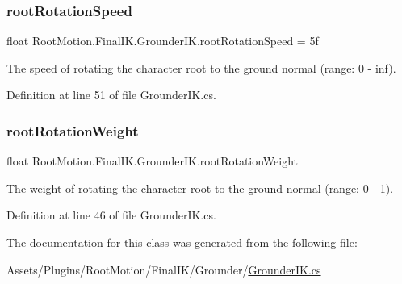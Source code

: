 \subsubsection{\texorpdfstring{root\+Rotation\+Speed}{rootRotationSpeed}}
{\footnotesize\ttfamily float Root\+Motion.\+Final\+I\+K.\+Grounder\+I\+K.\+root\+Rotation\+Speed = 5f}



The speed of rotating the character root to the ground normal (range\+: 0 -\/ inf). 



Definition at line 51 of file Grounder\+I\+K.\+cs.

\mbox{\label{class_root_motion_1_1_final_i_k_1_1_grounder_i_k_a176e6eeb4faf46b2dd60b200647d121e}} 
\subsubsection{\texorpdfstring{root\+Rotation\+Weight}{rootRotationWeight}}
{\footnotesize\ttfamily float Root\+Motion.\+Final\+I\+K.\+Grounder\+I\+K.\+root\+Rotation\+Weight}



The weight of rotating the character root to the ground normal (range\+: 0 -\/ 1). 



Definition at line 46 of file Grounder\+I\+K.\+cs.



The documentation for this class was generated from the following file\+:\begin{DoxyCompactItemize}
\item 
Assets/\+Plugins/\+Root\+Motion/\+Final\+I\+K/\+Grounder/\mbox{\hyperlink{_grounder_i_k_8cs}{Grounder\+I\+K.\+cs}}\end{DoxyCompactItemize}
